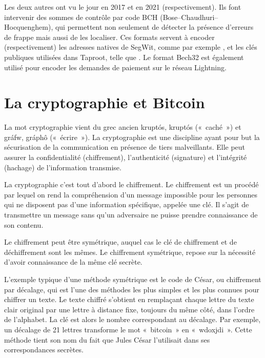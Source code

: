 Les deux autres ont vu le jour en 2017 et en 2021 (respectivement). Ils font intervenir des sommes de contrôle par code BCH (Bose–Chaudhuri–Hocquenghem), qui permettent non seulement de détecter la présence d'erreurs de frappe mais aussi de les localiser. Ces formats servent à encoder (respectivement) les adresses natives de SegWit, comme par exemple , et les clés publiques utilisées dans Taproot, telle que . Le format Bech32 est également utilisé pour encoder les demandes de paiement sur le réseau Lightning.

\section*{La cryptographie et Bitcoin}

La mot cryptographie vient du grec ancien \foreignlanguage{greek}{kruptós}, kruptós («~caché~») et \foreignlanguage{greek}{gráfw}, gráphô («~écrire~»). La cryptographie est une discipline ayant pour but la sécurisation de la communication en présence de tiers malveillants. Elle peut assurer la confidentialité (chiffrement), l'authenticité (signature) et l'intégrité (hachage) de l'information transmise.


La cryptographie c'est tout d'abord le chiffrement. Le chiffrement est un procédé par lequel on rend la compréhension d'un message impossible pour les personnes qui ne disposent pas d'une information spécifique, appelée une clé. Il s'agit de transmettre un message sans qu'un adversaire ne puisse prendre connaissance de son contenu.


Le chiffrement peut être symétrique, auquel cas le clé de chiffrement et de déchiffrement sont les mêmes. Le chiffrement symétrique, repose sur la nécessité d'avoir connaissance de la même clé secrète. 

L'exemple typique d'une méthode symétrique est le code de César, ou chiffrement par décalage, qui est l'une des méthodes les plus simples et les plus connues pour chiffrer un texte. Le texte chiffré s'obtient en remplaçant chaque lettre du texte clair original par une lettre à distance fixe, toujours du même côté, dans l'ordre de l'alphabet. La clé est alors le nombre correspondant au décalage. Par exemple, un décalage de 21 lettres transforme le mot «~bitcoin~» en «~wdoxjdi~». Cette méthode tient son nom du fait que Jules César l'utilisait dans ses correspondances secrètes.

